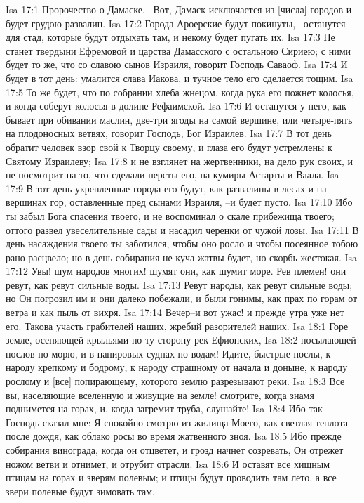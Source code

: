 Isa 17:1  Пророчество о Дамаске. --Вот, Дамаск исключается из [числа] городов и будет грудою развалин.
Isa 17:2  Города Ароерские будут покинуты, --останутся для стад, которые будут отдыхать там, и некому будет пугать их.
Isa 17:3  Не станет твердыни Ефремовой и царства Дамасского с остальною Сириею; с ними будет то же, что со славою сынов Израиля, говорит Господь Саваоф.
Isa 17:4  И будет в тот день: умалится слава Иакова, и тучное тело его сделается тощим.
Isa 17:5  То же будет, что по собрании хлеба жнецом, когда рука его пожнет колосья, и когда соберут колосья в долине Рефаимской.
Isa 17:6  И останутся у него, как бывает при обивании маслин, две-три ягоды на самой вершине, или четыре-пять на плодоносных ветвях, говорит Господь, Бог Израилев.
Isa 17:7  В тот день обратит человек взор свой к Творцу своему, и глаза его будут устремлены к Святому Израилеву;
Isa 17:8  и не взглянет на жертвенники, на дело рук своих, и не посмотрит на то, что сделали персты его, на кумиры Астарты и Ваала.
Isa 17:9  В тот день укрепленные города его будут, как развалины в лесах и на вершинах гор, оставленные пред сынами Израиля, --и будет пусто.
Isa 17:10  Ибо ты забыл Бога спасения твоего, и не воспоминал о скале прибежища твоего; оттого развел увеселительные сады и насадил черенки от чужой лозы.
Isa 17:11  В день насаждения твоего ты заботился, чтобы оно росло и чтобы посеянное тобою рано расцвело; но в день собирания не куча жатвы будет, но скорбь жестокая.
Isa 17:12  Увы! шум народов многих! шумят они, как шумит море. Рев племен! они ревут, как ревут сильные воды.
Isa 17:13  Ревут народы, как ревут сильные воды; но Он погрозил им и они далеко побежали, и были гонимы, как прах по горам от ветра и как пыль от вихря.
Isa 17:14  Вечер--и вот ужас! и прежде утра уже нет его. Такова участь грабителей наших, жребий разорителей наших.
Isa 18:1  Горе земле, осеняющей крыльями по ту сторону рек Ефиопских,
Isa 18:2  посылающей послов по морю, и в папировых суднах по водам! Идите, быстрые послы, к народу крепкому и бодрому, к народу страшному от начала и доныне, к народу рослому и [все] попирающему, которого землю разрезывают реки.
Isa 18:3  Все вы, населяющие вселенную и живущие на земле! смотрите, когда знамя поднимется на горах, и, когда загремит труба, слушайте!
Isa 18:4  Ибо так Господь сказал мне: Я спокойно смотрю из жилища Моего, как светлая теплота после дождя, как облако росы во время жатвенного зноя.
Isa 18:5  Ибо прежде собирания винограда, когда он отцветет, и грозд начнет созревать, Он отрежет ножом ветви и отнимет, и отрубит отрасли.
Isa 18:6  И оставят все хищным птицам на горах и зверям полевым; и птицы будут проводить там лето, а все звери полевые будут зимовать там.
